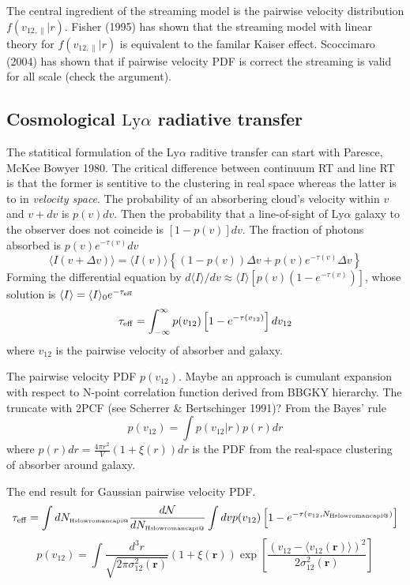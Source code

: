 \documentclass[useAMS,usenatbib,twocolumn]{mn2e}
\makeatletter
\newcommand{\Rmnum}[1]{\expandafter\@slowromancap\romannumeral #1@}
\newcommand{\LyA}{\mbox{Ly}\alpha}
\newcommand{\NHI}{N_{\mbox{\tiny H\Rmnum{1}}}}
\makeatother
\begin{document}
The central ingredient of the streaming model is the pairwise velocity
distribution $f(v_{12,\parallel}|r)$. Fisher (1995) has shown that the streaming
model with linear theory for $f(v_{12,\parallel}|r)$ is equivalent to the familar
Kaiser effect. Scoccimaro (2004) has shown that if pairwise velocity PDF is 
correct the streaming is valid for all scale (check the argument).


\subsection{Cosmological $\LyA$ radiative transfer}
The statitical formulation of the $\LyA$ raditive transfer can start
with Paresce, McKee Bowyer 1980. The critical difference between continuum
RT and line RT is that the former is sentitive to the clustering in real
space whereas the latter is to in \textit{velocity space}.
The probability of an absorbering cloud's velocity within $v$ and $v+dv$
is $p(v)dv$. Then the probability that a line-of-sight of $\LyA$ galaxy to 
the observer does not coincide is $[1-p(v)]dv$. The fraction of photons absorbed
is $p(v)e^{-\tau(v)}dv$
\begin{equation}
\langle I(v+\Delta v)\rangle=\langle I(v)\rangle
\left\{
(1-p(v))\Delta v+p(v)e^{-\tau(v)}\Delta v
\right\}
\end{equation}
Forming the differential equation by $d\langle I\rangle/dv\approx
\langle I\rangle[p(v)(1-e^{-\tau(v)})]$, whose solution is
$\langle I\rangle=\langle I\rangle_0e^{-\tau_{\rm{eff}}}$
\begin{equation}
\tau_{\rm{eff}}=\int_{-\infty}^\infty p(v_{12})\left[1-e^{-\tau(v_{12})}\right]dv_{12}
\end{equation}
where $v_{12}$ is the pairwise velocity of absorber and galaxy.

The pairwise velocity PDF $p(v_{12})$. Maybe an approach is cumulant
expansion with respect to N-point correlation function derived from 
BBGKY hierarchy. The truncate with 2PCF (see Scherrer \& Bertschinger 1991)? 
From the Bayes' rule 
\begin{equation}
p(v_{12})=\int p(v_{12}|r)p(r)dr
\end{equation}
where $p(r)dr=\frac{4\pi r^2}{V}(1+\xi(r))dr$ is the PDF from the 
real-space clustering of absorber around galaxy.

The end result for Gaussian pairwise velocity PDF.
\begin{equation}
\tau_{\rm{eff}}=\int d\NHI\frac{d\mathcal{N}}{d\NHI}
\int dv p(v_{12})\left[1-e^{-\tau(v_{12},\NHI)}\right]
\end{equation}
\begin{equation}
p(v_{12})=\int \frac{d^3r}{\sqrt{2\pi\sigma_{12}^2(\boldsymbol{r})}}
\left(1+\xi(\boldsymbol{r})\right)
\exp\left[\frac{(v_{12}-\langle v_{12}(\boldsymbol{r})\rangle)^2}
{2\sigma_{12}^2(\boldsymbol{r})}\right]
\end{equation}
\end{document}
